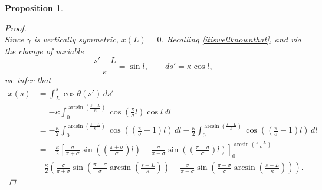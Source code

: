 \documentclass[11pt]{amsart}
\renewcommand{\k}{\kappa}
\newtheorem{proposition}[theorem]{Proposition}
\theoremstyle{definition}
\theoremstyle{remark}
\numberwithin{equation}{section}
\begin{document}
\begin{proposition}
\begin{proof}
\begin{equation*}
	\end{equation*}
	Since $\gamma$ is vertically symmetric, $x(L)=0$. Recalling \eqref{itiswellknownthat}, and via the change of variable
	\begin{equation}\label{changevar}
		\frac{s'-L}{\k}=\sin l,\qquad ds'=\k\cos l,
	\end{equation}
	we infer that
	\begin{equation*}
		\begin{split}
			x(s)&=\int_L^s\cos\theta(s')\,ds'\\
			&=-\k\int_0^{\arcsin\left(\frac{s-L}{\k}\right)}\cos \left(\frac{\pi}{\sigma} l\right)\cos l\,d l\\
			&=-\frac{\k}{2}\int_0^{\arcsin\left(\frac{s-L}{\k}\right)}\cos\left(\left(\frac{\pi}{\sigma}+1\right)l\right)\,dl-\frac{\k}{2}\int_0^{\arcsin\left(\frac{s-L}{\k}\right)}\cos\left(\left(\frac{\pi}{\sigma}-1\right)l\right)\,d l\\
			&=-\frac{\k}{2}\left[\frac{\sigma}{\pi+\sigma}\sin\left(\left(\frac{\pi+\sigma}{\sigma}\right)l\right)+\frac{\sigma}{\pi-\sigma}\sin\left(\left(\frac{\pi-\sigma}{\sigma}\right)l\right)\right]_0^{\arcsin\left(\frac{s-L}{\k}\right)}\\
			&-\frac{\k}{2}\left(\frac{\sigma}{\pi+\sigma}\sin\left(\frac{\pi+\sigma}{\sigma}\arcsin\left(\frac{s-L}{\k}\right)\right)+\frac{\sigma}{\pi-\sigma}\sin\left(\frac{\pi-\sigma}{\sigma}\arcsin\left(\frac{s-L}{\k}\right)\right)\right).
		\end{split}
	\end{equation*}

\end{proof}
\end{proposition}
\end{document}
